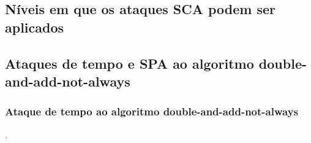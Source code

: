 \subsection{Níveis em que os ataques SCA podem ser aplicados}

\begin{comment}
\subsubsection{Operações na curva}
\subsubsection{Operações no protocolo criptográfico}
\subsubsection{Transferência da chave entre diferentes memórias}

\subsubsection{Protocolo em nível de aplicação}
\end{comment}







\subsection{Ataques de tempo e SPA ao algoritmo double-and-add-not-always}

\subsubsection{Ataque de tempo ao algoritmo double-and-add-not-always}
.

